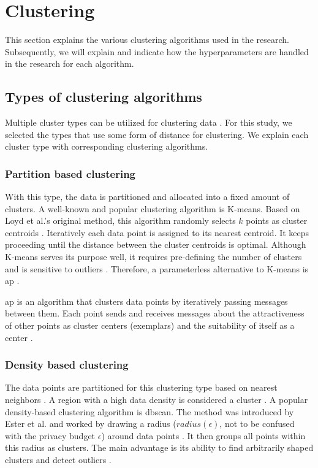 \section{Clustering}
This section explains the various clustering algorithms used in the research.
Subsequently, we will explain and indicate how the hyperparameters are handled in the research for each algorithm.
\subsection{Types of clustering algorithms}
Multiple cluster types can be utilized for clustering data \citep{xu_comprehensive_2015}.
For this study, we selected the types that use some form of distance for clustering.
We explain each cluster type with corresponding clustering algorithms.
\subsubsection{Partition based clustering}
With this type, the data is partitioned and allocated into a fixed amount of clusters.
A well-known and popular clustering algorithm is K-means.
Based on Loyd et al.'s original method, this algorithm randomly selects $k$ points as cluster centroids \citep{1056489}.
Iteratively each data point is assigned to its nearest centroid.
It keeps proceeding until the distance between the cluster centroids is optimal.
Although K-means serves its purpose well, it requires pre-defining the number of clusters and is sensitive to outliers \citep{keller_balancing_2021}.
Therefore, a parameterless alternative to K-means is \gls{ap} \citep{frey_clustering_2007}.

\gls{ap} is an algorithm that clusters data points by iteratively passing messages between them.
Each point sends and receives messages about the attractiveness of other points as cluster centers (exemplars) and the suitability of itself as a center \citep{keller_balancing_2021}.

\subsubsection{Density based clustering}
The data points are partitioned for this clustering type based on nearest neighbors \citep{fahad_survey_2014}.
A region with a high data density is considered a cluster \citep{xu_comprehensive_2015}.
A popular density-based clustering algorithm is \gls{dbscan}.
The method was introduced by Ester et al. and worked by drawing a radius ($radius(\epsilon)$, not to be confused with the privacy budget $\epsilon$) around data points \citep{ester_density-based_nodate}.
It then groups all points within this radius as clusters.
The main advantage is its ability to find arbitrarily shaped clusters and detect outliers \citep{liu_privacy_2012}.

